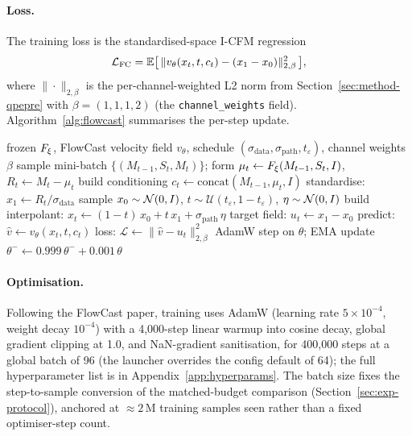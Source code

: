 \paragraph{Loss.} The training loss is the standardised-space I-CFM regression
\begin{equation}
  \mathcal{L}_{\text{FC}} = \mathbb{E}\bigl[\,\|v_\theta(x_t, t, c_t) - (x_1 - x_0)\|_{2,\beta}^2\,\bigr],
  \label{eq:flowcast-loss}
\end{equation}
where $\|\cdot\|_{2,\beta}$ is the per-channel-weighted L2 norm from Section~\ref{sec:method-qpepre} with $\beta = (1, 1, 1, 2)$ (the \texttt{channel\_weights} field). Algorithm~\ref{alg:flowcast} summarises the per-step update.

\begin{algorithm}[t]
\caption{FlowCast training step (I-CFM on the standardised residual)}
\label{alg:flowcast}
\begin{algorithmic}[1]
\Require frozen $F_{\xi}$, FlowCast velocity field $v_\theta$, schedule $(\sigma_{\text{data}}, \sigma_{\text{path}}, t_\varepsilon)$, channel weights $\beta$
\State sample mini-batch $\{(M_{t-1}, S_t, M_t)\}$; form $\mu_t \gets F_{\xi}(M_{t-1}, S_t, I)$, $R_t \gets M_t - \mu_t$
\State build conditioning $c_t \gets \mathrm{concat}(M_{t-1}, \mu_t, I)$ 
\State standardise: $x_1 \gets R_t / \sigma_{\text{data}}$
\State sample $x_0 \sim \mathcal{N}(0, I)$, $t \sim \mathcal{U}(t_\varepsilon, 1 - t_\varepsilon)$, $\eta \sim \mathcal{N}(0, I)$
\State build interpolant: $x_t \gets (1 - t)\,x_0 + t\,x_1 + \sigma_{\text{path}}\,\eta$
\State target field: $u_t \gets x_1 - x_0$
\State predict: $\hat{v} \gets v_\theta(x_t, t, c_t)$
\State loss: $\mathcal{L} \gets \|\hat{v} - u_t\|_{2,\beta}^2$
\State AdamW step on $\theta$; EMA update $\theta^{-} \gets 0.999\,\theta^{-} + 0.001\,\theta$
\end{algorithmic}
\end{algorithm}

\paragraph{Optimisation.} Following the FlowCast paper, training uses AdamW (learning rate $5 \times 10^{-4}$, weight decay $10^{-4}$) with a 4{,}000-step linear warmup into cosine decay, global gradient clipping at 1.0, and NaN-gradient sanitisation, for 400{,}000 steps at a global batch of 96 (the launcher overrides the config default of 64); the full hyperparameter list is in Appendix~\ref{app:hyperparams}. The batch size fixes the step-to-sample conversion of the matched-budget comparison (Section~\ref{sec:exp-protocol}), anchored at $\approx 2\,\text{M}$ training samples seen rather than a fixed optimiser-step count.

